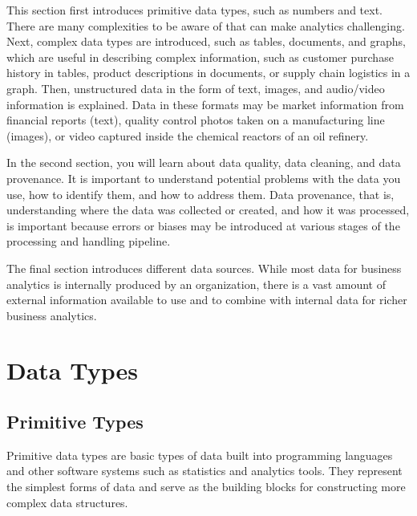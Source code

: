 This section first introduces primitive data types, such as numbers and text. There are many complexities to be aware of that can make analytics challenging. Next, complex data types are introduced, such as tables, documents, and graphs, which are useful in describing complex information, such as customer purchase history in tables, product descriptions in documents, or supply chain logistics in a graph. Then, unstructured data in the form of text, images, and audio/video information is explained. Data in these formats may be market information from financial reports (text), quality control photos taken on a manufacturing line (images), or video captured inside the chemical reactors of an oil refinery.

In the second section, you will learn about data quality, data cleaning, and data provenance. It is important to understand potential problems with the data you use, how to identify them, and how to address them. Data provenance, that is, understanding where the data was collected or created, and how it was processed, is important because errors or biases may be introduced at various stages of the processing and handling pipeline.

The final section introduces different data sources. While most data for business analytics is internally produced by an organization, there is a vast amount of external information available to use and to combine with internal data for richer business analytics. 

\section{Data Types}

\subsection{Primitive Types}

Primitive data types are basic types of data built into programming languages and other software systems such as statistics and analytics tools. They represent the simplest forms of data and serve as the building blocks for constructing more complex data structures.

